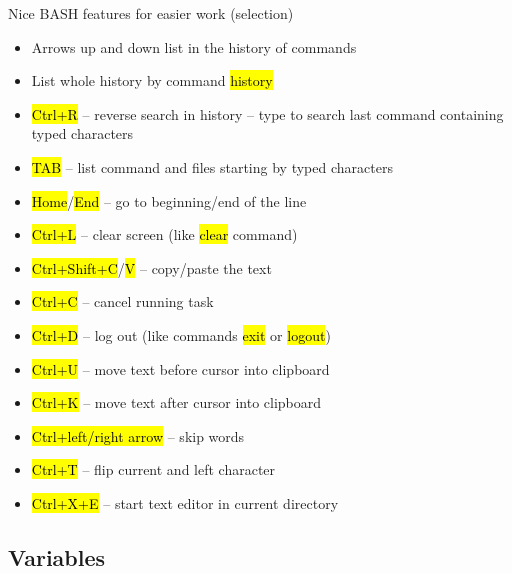 \documentclass[compress, ucs, xelatex, 11pt, xcolor=svgnames,
  hyperref={
    bookmarks=true,
    unicode=true,
    colorlinks=true,
    pdftitle={Linux, command line and MetaCentrum},
    plainpages=false,
    pdfauthor={Vojtech Zeisek},
    pdfsubject={Course about use of Linux command line, writing shell scripts and using MetaCentrum of CESNET},
    pdfcreator={XeLaTeX},
    pdfkeywords={Linux, GNU, BASH, shell, command line, MetaCentrum},
    linkcolor=DarkRed,
    anchorcolor=DarkBlue,
    citecolor=Indigo,
    filecolor=NavyBlue,
    menucolor=DarkMagenta,
    urlcolor=DarkBlue,
    pdftex},
  url={hyphens, lowtilde} %
  ]{beamer}
\renewcommand{\texttt}[1]{\hl{\ttfamily #1}}
\begin{document}
\begin{frame}{Nice BASH features for easier work (selection)}
\begin{itemize}
  \item Arrows up and down list in the history of commands
  \item List whole history by command \texttt{history}
  \item \texttt{Ctrl+R} -- reverse search in history -- type to search last command containing typed characters
  \item \texttt{TAB} -- list command and files starting by typed characters
  \item \texttt{Home}/\texttt{End} -- go to beginning/end of the line
  \item \texttt{Ctrl+L} -- clear screen (like \texttt{clear} command)
  \item \texttt{Ctrl+Shift+C}/\texttt{V} -- copy/paste the text
  \item \texttt{Ctrl+C} -- cancel running task
  \item \texttt{Ctrl+D} -- log out (like commands \texttt{exit} or \texttt{logout})
  \item \texttt{Ctrl+U} -- move text before cursor into clipboard
  \item \texttt{Ctrl+K} -- move text after cursor into clipboard
  \item \texttt{Ctrl+left/right arrow} -- skip words
  \item \texttt{Ctrl+T} -- flip current and left character
  \item \texttt{Ctrl+X+E} -- start text editor in current directory
\end{itemize}
\end{frame}

\subsection{Variables}
\end{document}
